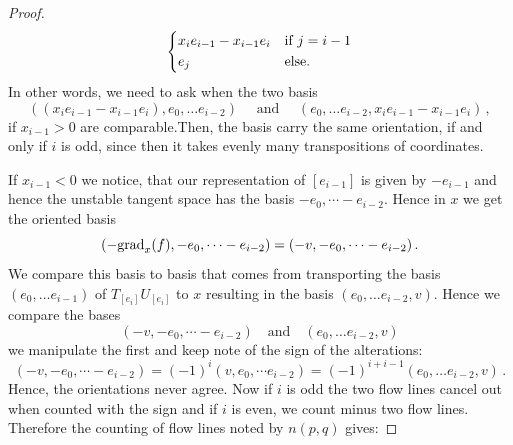 \begin{example}
\begin{proof}
\begin{equation*}
\begin{cases*}
					x_ie_{i-1}-x_{i-1}e_i& if $j=i-1$\\
					e_j & else.
				\end{cases*}
			\end{equation*} In other words, we need to ask when the two basis
			\begin{equation*}
				((x_ie_{i-1}-x_{i-1}e_i),e_0,\dots e_{i-2}) \quad \text{ and }\quad (e_0,\dots e_{i-2},x_ie_{i-1}-x_{i-1}e_i)\,,
			\end{equation*} if  $x_{i-1}>0$ are comparable.Then, the basis carry the same orientation, if and only if $i$ is odd, since then it takes evenly many transpositions of coordinates. 
			
			If $x_{i-1}<0$ we notice, that our representation of $[e_{i-1}]$ is given by $-e_{i-1}$ and hence the unstable tangent space has the basis $-e_0,\cdots -e_{i-2}$. Hence in $x$ we get the oriented basis 
			\begin{equation*}
				(-\mathrm{grad}_x(f),-e_0,\cdots -e_{i-2})=(-v,-e_0,\cdots -e_{i-2})\,.
			\end{equation*} We compare this basis to basis that comes from transporting the basis $(e_0,\dots e_{i-1})$ of $T_{[e_i]}U_{[e_i]}$ to $x$ resulting in the basis $(e_0,\dots e_{i-2},v)$. Hence we compare the bases 
			\begin{equation*}
				(-v,-e_0,\cdots -e_{i-2}) \quad \text{and}\quad (e_0,\dots e_{i-2},v)
			\end{equation*} we manipulate the first and keep note of the sign of the alterations:
			\begin{equation*}
				(-v,-e_0,\cdots -e_{i-2})=(-1)^{i}(v,e_0,\cdots e_{i-2}) =(-1)^{i+i-1}(e_0,\dots e_{i-2},v)\,.
			\end{equation*} Hence, the orientations never agree. Now if $i$ is odd the two flow lines cancel out when counted with the sign and if $i$ is even, we count minus two flow lines. Therefore the counting of flow lines noted by $n(p,q)$ gives: 
			

\end{proof}
\end{example}

